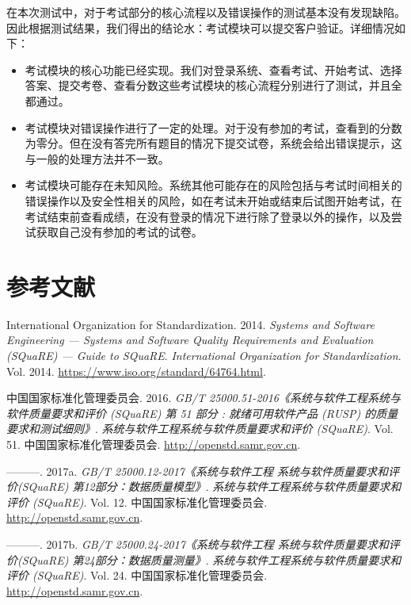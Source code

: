 \documentclass[hyperref, a4paper]{ctexart}
\begin{document}
在本次测试中，对于考试部分的核心流程以及错误操作的测试基本没有发现缺陷。因此根据测试结果，我们得出的结论水：考试模块可以提交客户验证。详细情况如下：

\begin{itemize}
\item
  考试模块的核心功能已经实现。我们对登录系统、查看考试、开始考试、选择答案、提交考卷、查看分数这些考试模块的核心流程分别进行了测试，并且全都通过。
\item
  考试模块对错误操作进行了一定的处理。对于没有参加的考试，查看到的分数为零分。但在没有答完所有题目的情况下提交试卷，系统会给出错误提示，这与一般的处理方法并不一致。
\item
  考试模块可能存在未知风险。系统其他可能存在的风险包括与考试时间相关的错误操作以及安全性相关的风险，如在考试未开始或结束后试图开始考试，在考试结束前查看成绩，在没有登录的情况下进行除了登录以外的操作，以及尝试获取自己没有参加的考试的试卷。
\end{itemize}

\pagebreak

\hypertarget{ux53c2ux8003ux6587ux732e}{%
\section*{参考文献}\label{ux53c2ux8003ux6587ux732e}}

\hypertarget{refs}{}
\leavevmode\hypertarget{ref-innovativeInternationalisation}{}%
International Organization for Standardization. 2014. \emph{Systems and
Software Engineering --- Systems and Software Quality Requirements and
Evaluation (SQuaRE) --- Guide to SQuaRE}. \emph{International
Organization for Standardization}. Vol. 2014.
\url{https://www.iso.org/standard/64764.html}.

\leavevmode\hypertarget{ref-innovative1}{}%
中国国家标准化管理委员会. 2016. \emph{GB/T
25000.51-2016《系统与软件工程系统与软件质量要求和评价 (SQuaRE) 第 51
部分 : 就绪可用软件产品 (RUSP) 的质量要求和测试细则》}.
\emph{系统与软件工程系统与软件质量要求和评价 (SQuaRE)}. Vol. 51.
中国国家标准化管理委员会. \url{http://openstd.samr.gov.cn}.

\leavevmode\hypertarget{ref-innovative3}{}%
---------. 2017a. \emph{GB/T 25000.12-2017《系统与软件工程
系统与软件质量要求和评价(SQuaRE) 第12部分：数据质量模型》}.
\emph{系统与软件工程系统与软件质量要求和评价 (SQuaRE)}. Vol. 12.
中国国家标准化管理委员会. \url{http://openstd.samr.gov.cn}.

\leavevmode\hypertarget{ref-innovative4}{}%
---------. 2017b. \emph{GB/T 25000.24-2017《系统与软件工程
系统与软件质量要求和评价(SQuaRE) 第24部分：数据质量测量》}.
\emph{系统与软件工程系统与软件质量要求和评价 (SQuaRE)}. Vol. 24.
中国国家标准化管理委员会. \url{http://openstd.samr.gov.cn}.
\end{document}
